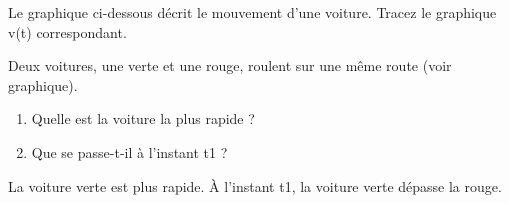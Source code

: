 \begin{exercise}
    Le graphique ci-dessous décrit le mouvement d'une voiture. Tracez le graphique v(t) correspondant.

\end{exercise}

\begin{exercise}
    Deux voitures, une verte et une rouge, roulent sur une même route (voir graphique).
    \begin{enumerate}[label=\alph*)]
        \item Quelle est la voiture la plus rapide ?
        \item Que se passe-t-il à l'instant t1 ?
    \end{enumerate}

\end{exercise}
\begin{solution}
    La voiture verte est plus rapide. À l'instant t1, la voiture verte dépasse la rouge.
\end{solution}

\newpage

